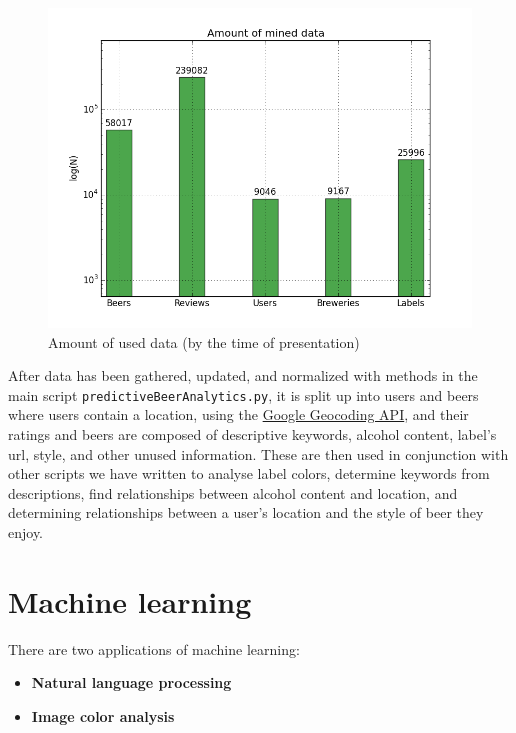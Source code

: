 \documentclass[10pt]{IEEEtran}
\begin{document}
\begin{figure}[h]
  \centering
  \includegraphics[width=\columnwidth]{./graphics/quantity.png}
  \caption{Amount of used data (by the time of presentation)}
  \label{fig:dataQuantity}
\end{figure}

After data has been gathered, updated, and normalized with methods in the main script \texttt{predictiveBeerAnalytics.py}, it is split up into users and beers where users contain a location, using the \href{https://developers.google.com/maps/documentation/geocoding/}{Google Geocoding API}, and their ratings and beers are composed of descriptive keywords, alcohol content, label's url, style, and other unused information. These are then used in conjunction with other scripts we have written to analyse label colors, determine keywords from descriptions, find relationships between alcohol content and location, and  determining relationships between a user's location and the style of beer they enjoy.

\section{Machine learning}
There are two applications of machine learning: 

\hspace{0.3 cm}
\begin{itemize}
  \item \textbf{Natural language processing}
  \item \textbf{Image color analysis}
\end{itemize}
\hspace{0.3 cm}
\end{document}
